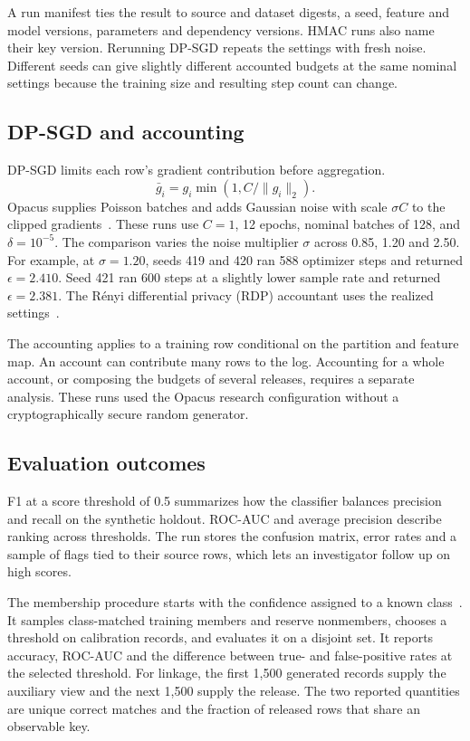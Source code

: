 \documentclass[conference]{IEEEtran}
\begin{document}
A run manifest ties the result to source and dataset digests, a seed, feature and model versions, parameters and dependency versions. HMAC runs also name their key version. Rerunning DP-SGD repeats the settings with fresh noise. Different seeds can give slightly different accounted budgets at the same nominal settings because the training size and resulting step count can change.

\newpage
\subsection{DP-SGD and accounting}
DP-SGD limits each row's gradient contribution before aggregation.
\begin{equation}
\bar g_i=g_i\min(1,C/\|g_i\|_2).
\end{equation}
Opacus supplies Poisson batches and adds Gaussian noise with scale $\sigma C$ to the clipped gradients~\cite{abadi,opacus}. These runs use $C=1$, 12 epochs, nominal batches of 128, and $\delta=10^{-5}$. The comparison varies the noise multiplier $\sigma$ across 0.85, 1.20 and 2.50. For example, at $\sigma=1.20$, seeds 419 and 420 ran 588 optimizer steps and returned $\epsilon=2.410$. Seed 421 ran 600 steps at a slightly lower sample rate and returned $\epsilon=2.381$. The R\'enyi differential privacy (RDP) accountant uses the realized settings~\cite{mironov}.

The accounting applies to a training row conditional on the partition and feature map. An account can contribute many rows to the log. Accounting for a whole account, or composing the budgets of several releases, requires a separate analysis. These runs used the Opacus research configuration without a cryptographically secure random generator.

\subsection{Evaluation outcomes}
F1 at a score threshold of 0.5 summarizes how the classifier balances precision and recall on the synthetic holdout. ROC-AUC and average precision describe ranking across thresholds. The run stores the confusion matrix, error rates and a sample of flags tied to their source rows, which lets an investigator follow up on high scores.

The membership procedure starts with the confidence assigned to a known class~\cite{shokri}. It samples class-matched training members and reserve nonmembers, chooses a threshold on calibration records, and evaluates it on a disjoint set. It reports accuracy, ROC-AUC and the difference between true- and false-positive rates at the selected threshold. For linkage, the first 1,500 generated records supply the auxiliary view and the next 1,500 supply the release. The two reported quantities are unique correct matches and the fraction of released rows that share an observable key.
\end{document}
